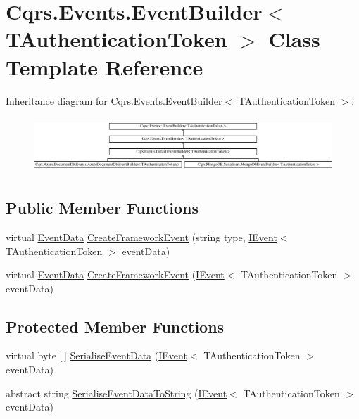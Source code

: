 \hypertarget{classCqrs_1_1Events_1_1EventBuilder}{}\section{Cqrs.\+Events.\+Event\+Builder$<$ T\+Authentication\+Token $>$ Class Template Reference}
\label{classCqrs_1_1Events_1_1EventBuilder}
Inheritance diagram for Cqrs.\+Events.\+Event\+Builder$<$ T\+Authentication\+Token $>$\+:\begin{figure}[H]
\begin{center}
\leavevmode
\includegraphics[height=2.117202cm]{classCqrs_1_1Events_1_1EventBuilder}
\end{center}
\end{figure}
\subsection*{Public Member Functions}
\begin{DoxyCompactItemize}
\item 
virtual \hyperlink{classCqrs_1_1Events_1_1EventData}{Event\+Data} \hyperlink{classCqrs_1_1Events_1_1EventBuilder_aa6a794ef27f2795802a4390fd16535f6}{Create\+Framework\+Event} (string type, \hyperlink{interfaceCqrs_1_1Events_1_1IEvent}{I\+Event}$<$ T\+Authentication\+Token $>$ event\+Data)
\item 
virtual \hyperlink{classCqrs_1_1Events_1_1EventData}{Event\+Data} \hyperlink{classCqrs_1_1Events_1_1EventBuilder_abcc2515f98e4852ab656f1868e7a344c}{Create\+Framework\+Event} (\hyperlink{interfaceCqrs_1_1Events_1_1IEvent}{I\+Event}$<$ T\+Authentication\+Token $>$ event\+Data)
\end{DoxyCompactItemize}
\subsection*{Protected Member Functions}
\begin{DoxyCompactItemize}
\item 
virtual byte \mbox{[}$\,$\mbox{]} \hyperlink{classCqrs_1_1Events_1_1EventBuilder_a5392c1e86ea54fb96ee7af3a57f9af5a}{Serialise\+Event\+Data} (\hyperlink{interfaceCqrs_1_1Events_1_1IEvent}{I\+Event}$<$ T\+Authentication\+Token $>$ event\+Data)
\item 
abstract string \hyperlink{classCqrs_1_1Events_1_1EventBuilder_aefa7bfaea90123e143e108d46efc6603}{Serialise\+Event\+Data\+To\+String} (\hyperlink{interfaceCqrs_1_1Events_1_1IEvent}{I\+Event}$<$ T\+Authentication\+Token $>$ event\+Data)
\end{DoxyCompactItemize}


